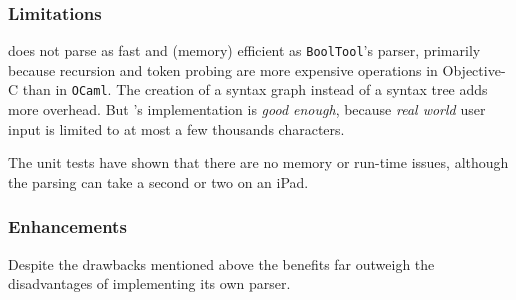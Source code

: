 \subsubsection{Limitations}

\BoolTool does not parse as fast and (memory) efficient as \verb+BoolTool+'s parser,
primarily because recursion and token probing are more expensive operations in Objective-C than in \verb+OCaml+.
The creation of a syntax graph instead of a syntax tree adds more overhead.
But \Nyaya's implementation is {\em good enough}, 
because {\em real world} user input is limited to at most a few thousands characters.

The unit tests have shown that there are no memory or run-time issues, 
although the parsing can take a second or two on an iPad.

\subsubsection{Enhancements}

Despite the drawbacks mentioned above
the benefits far outweigh the disadvantages of implementing its own parser.

